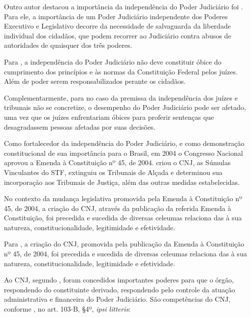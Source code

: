 Outro autor destacou a importância da independência do Poder Judiciário foi \cite{akutsu2012dimensoes}. Para ele, a importância de um Poder Judiciário independente dos Poderes Executivo e Legislativo decorre da necessidade de salvaguarda da liberdade individual dos cidadãos, que podem recorrer ao Judiciário contra abusos de autoridades de quaisquer dos três poderes. 

Para \cite{akutsu2012dimensoes}, a independência do Poder Judiciário não deve constituir óbice do cumprimento dos princípios e às normas da Constituição Federal pelos juízes. Além de poder serem responsabilizados perante os cidadãos. 

Complementarmente, para \cite{akutsu2012dimensoes} no caso da premissa da independência dos juízes e tribunais não se concretize, o desempenho do Poder Judiciário pode ser afetado, uma vez que os juízes enfrentariam óbices para  proferir sentenças que desagradassem pessoas afetadas por suas decisões.

Como fortalecedor da independência do Poder Judiciário, e como demonstração constitucional de sua importância para o Brasil, em 2004 o Congresso Nacional aprovou a Emenda à Constituição nº 45, de 2004. \cite{ec45_2004} criou o CNJ, as Súmulas Vinculantes do STF, extinguiu os Tribunais de Alçada e determinou sua incorporação aos Tribunais de Justiça, além das outras medidas estabelecidas.

No contexto da mudança legislativa promovida pela  Emenda à Constituição nº 45, de 2004, a criação do CNJ, através da publicação da referida Emenda à Constituição, foi precedida e sucedida de diversas celeumas relaciona das à sua natureza, constitucionalidade, legitimidade e efetividade.

Para \cite{silva2013transparencia}, a criação do CNJ, promovida pela publicação da Emenda à Constituição nº 45, de 2004, foi precedida e sucedida de diversas celeumas relaciona das à sua natureza, constitucionalidade, legitimidade e efetividade.  

Ao CNJ, segundo \cite{silva2013transparencia}, foram concedidos importantes poderes para que o órgão, respondendo do constituinte derivado, respondendo pelo controle da atuação administrativa e financeira do Poder Judiciário. São competências do CNJ, conforme \cite{cf88}, no art. 103-B, §4º, \textit{ipsi litteris}:

